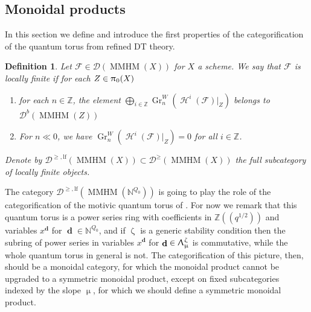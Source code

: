 \documentclass[a4paper,10pt]{amsart}
\renewcommand{\zeta}{\upzeta}
\renewcommand{\pi}{\uppi\hspace{0.05em}}
\renewcommand{\Lambda}{\Uplambda}
\renewcommand{\mu}{\upmu}
\newtheorem{definition}[theorem]{Definition}
\newcommand{\GrW}[1]{\Gr^W_{#1}}
\DeclareMathOperator{\MMHM}{MMHM}
\DeclareMathOperator{\Gr}{Gr}
\DeclareMathOperator{\dd}{\mathbf{d}}
\DeclareMathOperator{\Ho}{\mathcal{H}}
\newcommand{\Du}{\mathcal{D}^{\geq}}
\newcommand{\Dulf}{\mathcal{D}^{\geq, \mathrm{lf}}}
\newcommand{\Db}{\mathcal{D}^{b}}
\newcommand{\Dub}{\mathcal{D}}
\begin{document}
\subsection{Monoidal products}
\label{prodss}
In this section we define and introduce the first properties of the categorification of the quantum torus from refined DT theory.
\begin{definition}
\label{lfDef}
Let $\mathcal{F}\in\Dub(\MMHM(X))$ for $X$ a scheme.  We say that $\mathcal{F}$ is \textit{locally finite} if for each $Z\in \pi_0(X)$
\begin{enumerate}
\item
for each $n\in\mathbb{Z}$, the element $\bigoplus_{i\in\mathbb{Z}}\GrW{n}(\Ho^i(\mathcal{F})|_Z)$ belongs to $\Db(\MMHM(Z))$
\item
For $n\ll 0$, we have $\GrW{n}(\Ho^i(\mathcal{F})|_Z)=0$ for all $i\in\mathbb{Z}$.
\end{enumerate}
Denote by $\Dulf(\MMHM(X))\subset\Du(\MMHM(X))$ the full subcategory of locally finite objects.
\end{definition}

The category $\Dulf(\MMHM(\mathbb{N}^{Q_0}))$ is going to play the role of the categorification of the motivic quantum torus of \cite[Sec.6.2]{KS1}.  For now we remark that this quantum torus is a power series ring with coefficients in $\mathbb{Z}((q^{1/2}))$ and variables $x^{\dd}$ for $\dd\in\mathbb{N}^{Q_0}$, and if $\zeta$ is a generic stability condition then the subring of power series in variables $x^{\dd}$ for $\dd\in\Lambda_{\mu}^{\zeta}$ is commutative, while the whole quantum torus in general is not.  The categorification of this picture, then, should be a monoidal category, for which the monoidal product cannot be upgraded to a symmetric monoidal product, except on fixed subcategories indexed by the slope $\mu$, for which we should define a symmetric monoidal product.

\smallbreak
\end{document}
